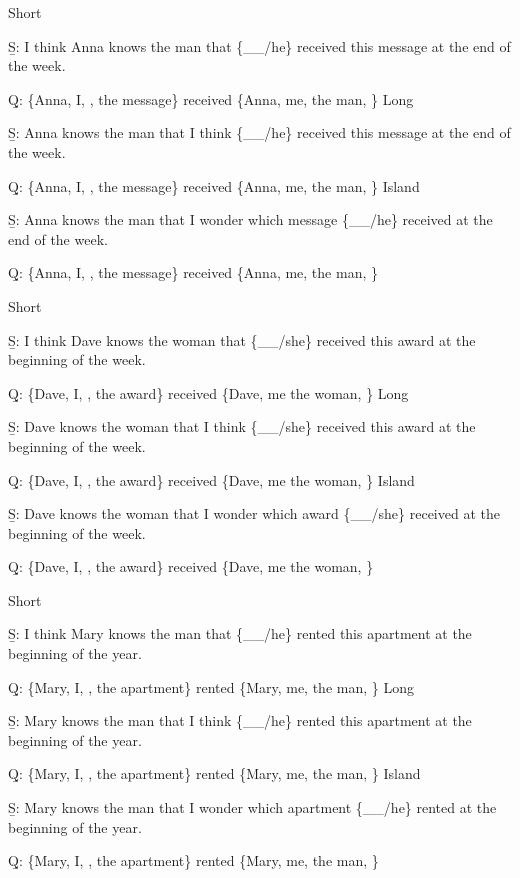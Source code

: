 \pex 
\a Short\par\nobreak
\beginsubsub 
\b{S:} I think Anna knows the man that \{\_\_/he\} received this message at the end of the week.\par\nobreak
\b{Q:} \{Anna, I, , the message\} received \{Anna, me, the man, \}
\endsubsub
\a Long\par\nobreak
\beginsubsub
\b{S:} Anna knows the man that I think \{\_\_/he\} received this message at the end of the week.\par\nobreak
\b{Q:} \{Anna, I, , the message\} received \{Anna, me, the man, \}
\endsubsub
\a Island\par\nobreak
\beginsubsub
\b{S:} Anna knows the man that I wonder which message \{\_\_/he\} received at the end of the week.\par\nobreak
\b{Q:} \{Anna, I, , the message\} received \{Anna, me, the man, \}
\endsubsub
\xe

\pex 
\a Short\par\nobreak
\beginsubsub 
\b{S:} I think Dave knows the woman that \{\_\_/she\} received this award at the beginning of the week.\par\nobreak
\b{Q:} \{Dave, I, , the award\} received \{Dave, me the woman, \}
\endsubsub
\a Long\par\nobreak
\beginsubsub
\b{S:} Dave knows the woman that I think \{\_\_/she\} received this award at the beginning of the week.\par\nobreak
\b{Q:} \{Dave, I, , the award\} received \{Dave, me the woman, \}
\endsubsub
\a Island\par\nobreak
\beginsubsub
\b{S:} Dave knows the woman that I wonder which award \{\_\_/she\} received at the beginning of the week.\par\nobreak
\b{Q:} \{Dave, I, , the award\} received \{Dave, me the woman, \}
\endsubsub
\xe

\pex 
\a Short\par\nobreak
\beginsubsub 
\b{S:} I think Mary knows the man that \{\_\_/he\} rented this apartment at the beginning of the year.\par\nobreak
\b{Q:} \{Mary, I, , the apartment\} rented \{Mary, me, the man, \}
\endsubsub
\a Long\par\nobreak
\beginsubsub
\b{S:} Mary knows the man that I think \{\_\_/he\} rented this apartment at the beginning of the year.\par\nobreak
\b{Q:} \{Mary, I, , the apartment\} rented \{Mary, me, the man, \}
\endsubsub
\a Island\par\nobreak
\beginsubsub
\b{S:} Mary knows the man that I wonder which apartment \{\_\_/he\} rented at the beginning of the year.\par\nobreak
\b{Q:} \{Mary, I, , the apartment\} rented \{Mary, me, the man, \}
\endsubsub
\xe

